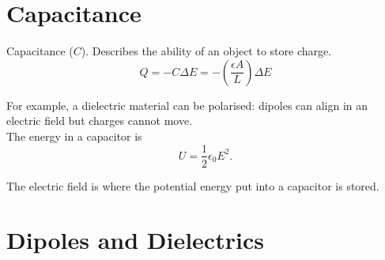 \section{Capacitance}

Capacitance ($C$). Describes the ability of an object to store charge.
$$Q = -C \Delta E = -\left(\frac{\epsilon A}{L}\right) \Delta E$$

For example, a dielectric material can be polarised: dipoles can align in an electric field
but charges cannot move. \\

The energy in a capacitor is
\begin{equation*}
    U = \frac{1}{2}\epsilon_0 E^2.
\end{equation*}

The electric field is where the potential energy put into a capacitor is stored.

\section{Dipoles and Dielectrics}
